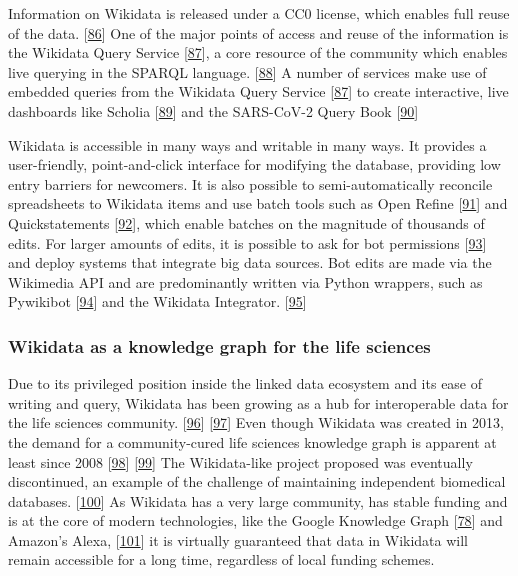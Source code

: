 Information on Wikidata is released under a CC0 license, which enables full reuse of the data. {[}\protect\hyperlink{ref-tQIJPG4k}{86}{]}
One of the major points of access and reuse of the information is the Wikidata Query Service {[}\protect\hyperlink{ref-2wDsXBwd}{87}{]}, a core resource of the community which enables live querying in the SPARQL language. {[}\protect\hyperlink{ref-t66jYhqe}{88}{]}
A number of services make use of embedded queries from the Wikidata Query Service {[}\protect\hyperlink{ref-2wDsXBwd}{87}{]} to create interactive, live dashboards like Scholia {[}\protect\hyperlink{ref-17P4zruFZ}{89}{]} and the SARS-CoV-2 Query Book {[}\protect\hyperlink{ref-guMp3q1V}{90}{]}

Wikidata is accessible in many ways and writable in many ways.
It provides a user-friendly, point-and-click interface for modifying the database, providing low entry barriers for newcomers.
It is also possible to semi-automatically reconcile spreadsheets to Wikidata items and use batch tools such as Open Refine {[}\protect\hyperlink{ref-17rRjL1Xj}{91}{]} and Quickstatements {[}\protect\hyperlink{ref-K6ggpwRg}{92}{]}, which enable batches on the magnitude of thousands of edits.
For larger amounts of edits, it is possible to ask for bot permissions {[}\protect\hyperlink{ref-sSH04fxa}{93}{]} and deploy systems that integrate big data sources.
Bot edits are made via the Wikimedia API and are predominantly written via Python wrappers, such as Pywikibot {[}\protect\hyperlink{ref-5K5MfnVl}{94}{]} and the Wikidata Integrator. {[}\protect\hyperlink{ref-qDI8I4IJ}{95}{]}

\hypertarget{wikidata-as-a-knowledge-graph-for-the-life-sciences}{%
\subsubsection{Wikidata as a knowledge graph for the life sciences}\label{wikidata-as-a-knowledge-graph-for-the-life-sciences}}

Due to its privileged position inside the linked data ecosystem and its ease of writing and query, Wikidata has been growing as a hub for interoperable data for the life sciences community. {[}\protect\hyperlink{ref-3GqlN9Dk}{96}{]} {[}\protect\hyperlink{ref-Ym2HoRLl}{97}{]}
Even though Wikidata was created in 2013, the demand for a community-cured life sciences knowledge graph is apparent at least since 2008 {[}\protect\hyperlink{ref-179mXrGIk}{98}{]} {[}\protect\hyperlink{ref-TItj7EYf}{99}{]}
The Wikidata-like project proposed was eventually discontinued, an example of the challenge of maintaining independent biomedical databases. {[}\protect\hyperlink{ref-P2QdZvGc}{100}{]}
As Wikidata has a very large community, has stable funding and is at the core of modern technologies, like the Google Knowledge Graph {[}\protect\hyperlink{ref-xLpRePoh}{78}{]} and Amazon's Alexa, {[}\protect\hyperlink{ref-bO7BekzO}{101}{]} it is virtually guaranteed that data in Wikidata will remain accessible for a long time, regardless of local funding schemes.

